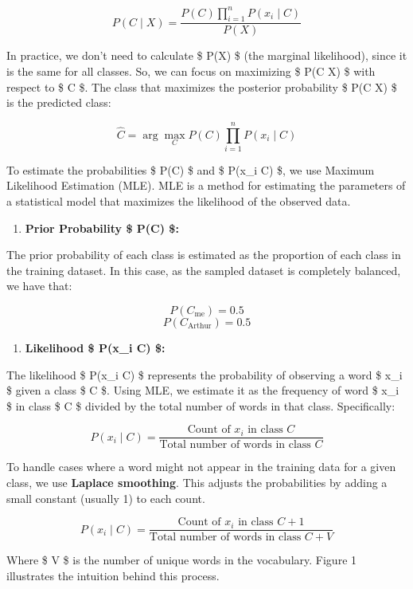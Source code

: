 \documentclass[11pt]{article}
\providecommand{\tightlist}{%
      \setlength{\itemsep}{0pt}\setlength{\parskip}{0pt}}
\begin{document}
\[
P(C \mid X) = \frac{P(C) \prod_{i=1}^{n} P(x_i \mid C)}{P(X)}
\]

In practice, we don't need to calculate \$ P(X) \$ (the marginal
likelihood), since it is the same for all classes. So, we can focus on
maximizing \$ P(C \mid X) \$ with respect to \$ C \$. The class that
maximizes the posterior probability \$ P(C \mid X) \$ is the predicted
class:

\[
\hat{C} = \arg\max_C P(C) \prod_{i=1}^{n} P(x_i \mid C)
\]

To estimate the probabilities \$ P(C) \$ and \$ P(x\_i \mid C) \$, we
use Maximum Likelihood Estimation (MLE). MLE is a method for estimating
the parameters of a statistical model that maximizes the likelihood of
the observed data.

\begin{enumerate}
\def\labelenumi{\arabic{enumi}.}
\tightlist
\item
  \textbf{Prior Probability \$ P(C) \$:}
\end{enumerate}

The prior probability of each class is estimated as the proportion of
each class in the training dataset. In this case, as the sampled dataset
is completely balanced, we have that:

\[
P(C_{\text{me}}) = 0.5
\] \[
P(C_{\text{Arthur}}) = 0.5
\]

\begin{enumerate}
\def\labelenumi{\arabic{enumi}.}
\setcounter{enumi}{1}
\tightlist
\item
  \textbf{Likelihood \$ P(x\_i \mid C) \$:}
\end{enumerate}

The likelihood \$ P(x\_i \mid C) \$ represents the probability of
observing a word \$ x\_i \$ given a class \$ C \$. Using MLE, we
estimate it as the frequency of word \$ x\_i \$ in class \$ C \$ divided
by the total number of words in that class. Specifically:

\[
P(x_i \mid C) = \frac{\text{Count of } x_i \text{ in class } C}{\text{Total number of words in class } C}
\]

To handle cases where a word might not appear in the training data for a
given class, we use \textbf{Laplace smoothing}. This adjusts the
probabilities by adding a small constant (usually 1) to each count.

\[
P(x_i \mid C) = \frac{\text{Count of } x_i \text{ in class } C + 1}{\text{Total number of words in class } C + V}
\]

Where \$ V \$ is the number of unique words in the vocabulary. Figure 1
illustrates the intuition behind this process.
\end{document}
